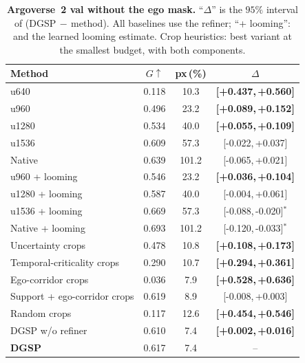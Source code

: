 \documentclass[10pt,letterpaper]{article}
\newcommand{\method}{DGSP\xspace}
\newcommand{\G}{G}
\newcommand{\ci}[2]{[#1,\allowbreak\,#2]}
\newcommand{\best}[1]{\textbf{#1}}
\newcommand{\oursrow}{\rowcolor{oursbg}}
\newcommand{\na}{--}
\newcommand{\sw}{$^{\ast}$}   %
\theoremstyle{remark}
\theoremstyle{plain}
\theoremstyle{definition}
\begin{document}
\begin{table}[!tbp]
\centering
\caption{\textbf{Argoverse~2 val without the ego mask.} ``$\Delta$'' is the $95\%$ interval of (\method$\,-\,$method). All baselines use the refiner; ``+ looming'': and the learned looming estimate. Crop heuristics: best variant at the smallest budget, with both components.}
\label{tab:hood}
\small
\setlength{\tabcolsep}{3pt}
\begin{tabular}{@{}lccc@{}}
\toprule
Method & $\G\uparrow$ & px\,(\%) & $\Delta$ \\
\midrule
u640 & 0.118 & 10.3 & \best{\ci{+0.437}{+0.560}} \\
u960 & 0.496 & 23.2 & \best{\ci{+0.089}{+0.152}} \\
u1280 & 0.534 & 40.0 & \best{\ci{+0.055}{+0.109}} \\
u1536 & 0.609 & 57.3 & \ci{-0.022}{+0.037} \\
Native & 0.639 & 101.2 & \ci{-0.065}{+0.021} \\
u960 + looming & 0.546 & 23.2 & \best{\ci{+0.036}{+0.104}} \\
u1280 + looming & 0.587 & 40.0 & \ci{-0.004}{+0.061} \\
u1536 + looming & 0.669 & 57.3 & \ci{-0.088}{-0.020}\sw \\
Native + looming & 0.693 & 101.2 & \ci{-0.120}{-0.033}\sw \\
\midrule
Uncertainty crops & 0.478 & 10.8 & \best{\ci{+0.108}{+0.173}} \\
Temporal-criticality crops & 0.290 & 10.7 & \best{\ci{+0.294}{+0.361}} \\
Ego-corridor crops & 0.036 & 7.9 & \best{\ci{+0.528}{+0.636}} \\
Support + ego-corridor crops & 0.619 & 8.9 & \ci{-0.008}{+0.003} \\
Random crops & 0.117 & 12.6 & \best{\ci{+0.454}{+0.546}} \\
\midrule
\method w/o refiner & 0.610 & 7.4 & \best{\ci{+0.002}{+0.016}} \\
\oursrow \textbf{\method} & 0.617 & 7.4 & \na \\
\bottomrule
\end{tabular}
\end{table}
\end{document}
